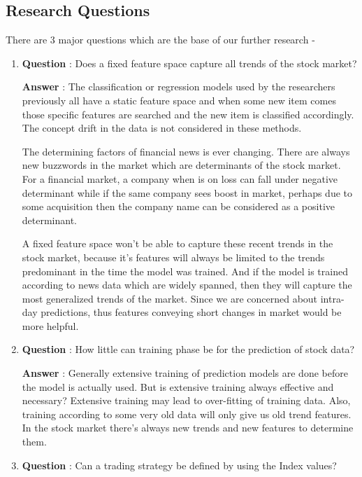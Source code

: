\documentclass[review,twocolumn,5p]{elsarticle}
\begin{document}
\subsection{Research Questions}
There are 3 major questions which are the base of our further research - 
\begin{enumerate}
\item \textbf{Question} : Does a fixed feature space capture all trends of the stock market?

\textbf{Answer} : The classification or regression models used by the researchers previously all have a static feature space and when some new item comes those specific features are searched and the new item is classified accordingly. The concept drift in the data is not considered in these methods.

The determining factors of financial news is ever changing. There are always new buzzwords in the market which are determinants of the stock market. For a financial market, a company when is on loss can fall under negative determinant while if the same company sees boost in market, perhaps due to some acquisition then the company name can be considered as a positive determinant. 

A fixed feature space won't be able to capture these recent trends in the stock market, because it's features will always be limited to the trends predominant in the time the model was trained. And if the model is trained according to news data which are widely spanned, then they will capture the most generalized trends of the market. Since we are concerned about intra-day predictions, thus features conveying short changes in market would be more helpful. 

\item \textbf{Question} : How little can training phase be for the prediction of stock data?

\textbf{Answer} : Generally extensive training of prediction models are done before the model is actually used. But is extensive training always effective and necessary? Extensive training may lead to over-fitting of training data. Also, training according to some very old data will only give us old trend features. In the stock market there's always new trends and new features to determine them.

\item \textbf{Question} : Can a trading strategy be defined by using the Index values?


\end{enumerate}
\end{document}
